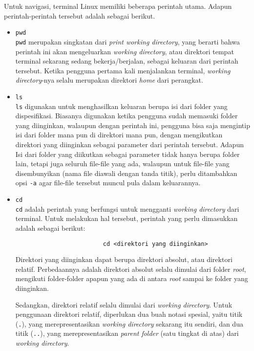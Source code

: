 Untuk navigasi, terminal Linux memiliki beberapa perintah utama. Adapun perintah-perintah tersebut adalah sebagai berikut.

\begin{itemize}[listparindent=\parindent]
	\item \verb|pwd|\\
	\verb|pwd| merupakan singkatan dari \textit{print working directory}, yang berarti bahwa perintah ini akan mengeluarkan \textit{working directory}, atau direktori tempat terminal sekarang sedang bekerja/berjalan, sebagai keluaran dari perintah tersebut. Ketika pengguna pertama kali menjalankan terminal, \textit{working directory}-nya selalu merupakan direktori \textit{home} dari perangkat.
	\item \verb|ls|\\
	\verb|ls| digunakan untuk menghasilkan keluaran berupa isi dari folder yang dispesifikasi. Biasanya digunakan ketika pengguna sudah memasuki folder yang diinginkan, walaupun dengan perintah ini, pengguna bisa saja mengintip isi dari folder mana pun di direktori mana pun, dengan mengikutkan direktori yang diinginkan sebagai parameter dari perintah tersebut. Adapun Isi dari folder yang diikutkan sebagai parameter tidak hanya berupa folder lain, tetapi juga seluruh file-file yang ada, walaupun untuk file-file yang disembunyikan (nama file diawali dengan tanda titik), perlu ditambahkan opsi \verb|-a| agar file-file tersebut muncul pula dalam keluarannya.
	\item \verb|cd|\\
	\verb|cd| adalah perintah yang berfungsi untuk mengganti \textit{working directory} dari terminal. Untuk melakukan hal tersebut, perintah yang perlu dimasukkan adalah sebagai berikut:
	
	\begin{verbatim}
	                     cd <direktori yang diinginkan>
	\end{verbatim}
	\noindent
	Direktori yang diinginkan dapat berupa direktori absolut, atau direktori relatif. Perbedaannya adalah direktori absolut selalu dimulai dari folder \textit{root}, mengikuti folder-folder apapun yang ada di antara \textit{root} sampai ke folder yang diinginkan.
	
	Sedangkan, direktori relatif selalu dimulai dari \textit{working directory}. Untuk penggunaan direktori relatif, diperlukan dua buah notasi spesial, yaitu titik (\verb|.|), yang merepresentasikan \textit{working directory} sekarang itu sendiri, dan dua titik (\verb|..|), yang merepresentasikan \textit{parent folder} (satu tingkat di atas) dari \textit{working directory}.
\end{itemize}

